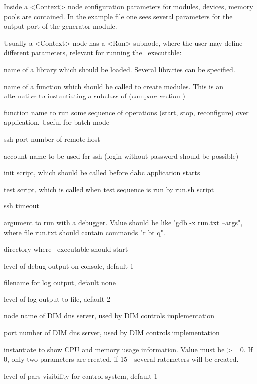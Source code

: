 Inside a <Context> node configuration parameters for modules, devices, memory pools are
contained.
In the example file one sees several parameters for the output port of 
the generator module.  

Usually a <Context> node has a <Run> subnode, where the user may define different parameters, relevant for running the \dabc\ executable:

\bdes
\item[lib] name of a library which should be loaded. Several libraries can be specified.
\item[func] name of a function which should be called to create modules. 
This is an alternative to instantiating a subclass of  
(compare section )
\item[runfunc] function name to run some sequence of operations (start, stop, reconfigure) over application. Useful
for batch mode                 
\item[port] ssh port number of remote host
\item[user] account name to be used for ssh (login without password should be possible)
\item[init] init script, which should be called before dabc application starts
\item[test] test script, which is called when test sequence is run by run.sh script
\item[timeout] ssh timeout 
\item[debugger] argument to run with a debugger. Value should be like "gdb -x run.txt --args", where file run.txt should contain commands "r bt q".
\item[workdir] directory where \dabc\ executable should start
\item[debuglevel] level of debug output on console, default 1
\item[logfile] filename for log output, default none  
\item[loglevel] level of log output to file, default 2 
\item[DIM\_DNS\_NODE] node name of DIM dns server, used by DIM controls implementation 
\item[DIM\_DNS\_PORT] port number of DIM dns server, used by DIM controls implementation
\item[cpuinfo] instantiate  to show CPU and memory usage information. 
Value must be >= 0. If 0, only two parameters are created, if 15 - several ratemeters will be created.    
\item[parslevel] level of pars visibility for control system, default 1 
\edes

